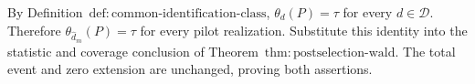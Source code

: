 By Definition~\(\mathrm{def{:}common\text{-}identification\text{-}class}\), \(\theta_d(P)=\tau\) for every \(d\in\mathcal D\). Therefore \(\theta_{\widehat d_m}(P)=\tau\) for every pilot realization. Substitute this identity into the statistic and coverage conclusion of Theorem~\(\mathrm{thm{:}postselection\text{-}wald}\). The total event and zero extension are unchanged, proving both assertions.